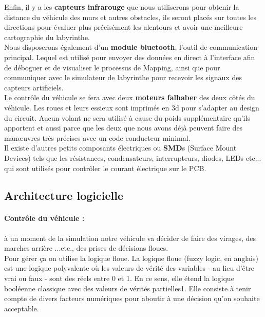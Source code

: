    Enfin, il y a les \textbf{capteurs infrarouge} que nous utiliserons pour
obtenir la distance du véhicule des murs et autres obstacles, ils seront
placés sur toutes les directions pour évaluer plus précisément les alentours
et avoir une meilleure cartographie du labyrinthe. \\


   Nous disposerons également d'un \textbf{module bluetooth}, l'outil de
communication principal.  Lequel est utilisé pour envoyer des données en
direct à l'interface afin de déboguer et de visualiser le processus de
Mapping, ainsi que pour communiquer avec le simulateur de labyrinthe pour
recevoir les signaux des capteurs artificiels. \\


   Le contrôle du véhicule se fera avec deux \textbf{moteurs falhaber}
\cite{faulhaber:1} des deux côtés du véhicule. Les roues et leurs essieux sont
imprimés en 3d pour s'adapter au design du circuit. Aucun volant ne sera
utilisé à cause du poids supplémentaire qu'ils apportent et aussi parce que
les deux que nous avons déjà peuvent faire des manœuvres très précises avec un
code conducteur minimal. \\


   Il existe d'autres petits composants électriques ou \textbf{SMD}s (Surface
Mount Devices) tels que les résistances, condensateurs, interrupteurs,
diodes, LEDs etc... qui sont utilisés pour contrôler le courant électrique
sur le PCB.

\subsection{Architecture logicielle} \label{sec:vueLogicielle}

\paragraph{Contrôle du véhicule :}à un moment de la simulation notre véhicule 
va décider de faire des virages, des marches arrière ...etc., des prises de 
décisions floues. \\

   Pour gérer ça on utilise la logique floue. La logique floue (fuzzy logic, en anglais) 
est une logique polyvalente où les valeurs de vérité des variables - au lieu d'être 
vrai ou faux - sont des réels entre 0 et 1. En ce sens, elle étend la logique booléenne 
classique avec des valeurs de vérités partielles1. Elle consiste à tenir compte de divers 
facteurs numériques pour aboutir à une décision qu'on souhaite acceptable. \\

